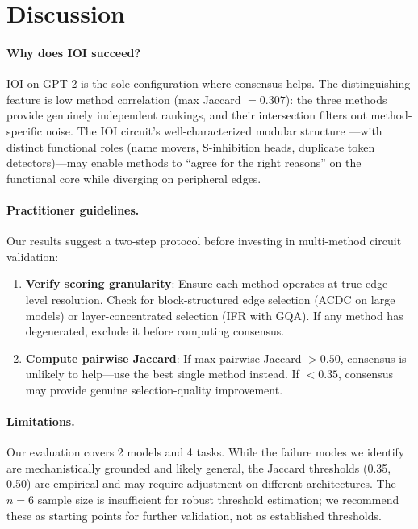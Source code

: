 \documentclass[11pt,a4paper]{article}
\newcommand{\acdc}{\textsc{ACDC}}
\newcommand{\ifr}{\textsc{IFR}}
\begin{document}
\section{Discussion}
\label{sec:discussion}

\paragraph{Why does IOI succeed?}
IOI on GPT-2 is the sole configuration where consensus helps. The distinguishing feature is low method correlation (max Jaccard $= 0.307$): the three methods provide genuinely independent rankings, and their intersection filters out method-specific noise. The IOI circuit's well-characterized modular structure \cite{wang2023interpretability}---with distinct functional roles (name movers, S-inhibition heads, duplicate token detectors)---may enable methods to ``agree for the right reasons'' on the functional core while diverging on peripheral edges.

\paragraph{Practitioner guidelines.}
Our results suggest a two-step protocol before investing in multi-method circuit validation:
\begin{enumerate}
    \item \textbf{Verify scoring granularity}: Ensure each method operates at true edge-level resolution. Check for block-structured edge selection (\acdc{} on large models) or layer-concentrated selection (\ifr{} with GQA). If any method has degenerated, exclude it before computing consensus.
    \item \textbf{Compute pairwise Jaccard}: If max pairwise Jaccard $> 0.50$, consensus is unlikely to help---use the best single method instead. If $< 0.35$, consensus may provide genuine selection-quality improvement.
\end{enumerate}

\paragraph{Limitations.}
Our evaluation covers 2 models and 4 tasks. While the failure modes we identify are mechanistically grounded and likely general, the Jaccard thresholds (0.35, 0.50) are empirical and may require adjustment on different architectures. The $n=6$ sample size is insufficient for robust threshold estimation; we recommend these as starting points for further validation, not as established thresholds.
\end{document}
